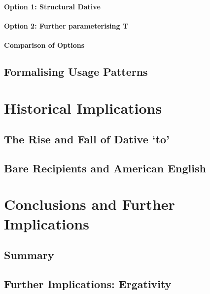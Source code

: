 \documentclass[11pt]{upenndiss}
\begin{document}
\subsubsection{Option 1: Structural Dative}
\subsubsection{Option 2: Further parameterising T}
\subsubsection{Comparison of Options}
\section{Formalising Usage Patterns}
\chapter{Historical Implications}\label{ch:history}
\section{The Rise and Fall of Dative `to'}
\section{Bare Recipients and American English}
\chapter{Conclusions and Further Implications}\label{ch:concl}
\section{Summary}
\section{Further Implications: Ergativity}


\end{document}
